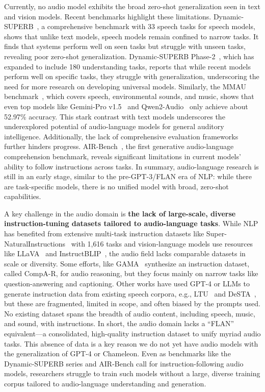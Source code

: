 Currently, no audio model exhibits the broad zero-shot generalization seen in text and vision models. Recent benchmarks highlight these limitations. Dynamic-SUPERB~\citep{huang2024dynamicsuperbdynamiccollaborativecomprehensive}, a comprehensive benchmark with 33 speech tasks for speech models, shows that unlike text models, speech models remain confined to narrow tasks. It finds that systems perform well on seen tasks but struggle with unseen tasks, revealing poor zero-shot generalization. Dynamic-SUPERB Phase-2~\citep{dynamicsuperb2}, which has expanded to include 180 understanding tasks, reports that while recent models perform well on specific tasks, they struggle with generalization, underscoring the need for more research on developing universal models. Similarly, the MMAU benchmark~\citep{mmau}, which covers speech, environmental sounds, and music, shows that even top models like Gemini-Pro v1.5~\citep{team2024gemini} and Qwen2-Audio~\citep{chu2024qwen2} only achieve about 52.97\% accuracy. This stark contrast with text models underscores the underexplored potential of audio-language models for general auditory intelligence. Additionally, the lack of comprehensive evaluation frameworks further hinders progress. AIR-Bench~\citep{AIR_Bench}, the first generative audio-language comprehension benchmark, reveals significant limitations in current models' ability to follow instructions across tasks. In summary, audio-language research is still in an early stage, similar to the pre-GPT-3/FLAN era of NLP: while there are task-specific models, there is no unified model with broad, zero-shot capabilities.

A key challenge in the audio domain is \textbf{the lack of large-scale, diverse instruction-tuning datasets tailored to audio-language tasks}. While NLP has benefited from extensive multi-task instruction datasets like Super-NaturalInstructions~\citep{Super_naturalinstructions} with 1,616 tasks and vision-language models use resources like LLaVA~\citep{LLaVA} and InstructBLIP~\citep{instructblip}, the audio field lacks comparable datasets in scale or diversity. 
Some efforts, like GAMA~\citep{GAMA} synthesize an instruction dataset, called CompA-R, for audio reasoning, but they focus mainly on narrow tasks like question-answering and captioning. Other works have used GPT-4 or LLMs to generate instruction data from existing speech corpora,  e.g., LTU~\citep{gong2023listen} and DeSTA~\citep{gong2023joint}, but these are fragmented, limited in scope, and often biased by the prompts used. 
No existing dataset spans the breadth of audio content, including speech, music, and sound, with instructions. In short, the audio domain lacks a “FLAN” equivalent—a consolidated, high-quality instruction dataset to unify myriad audio tasks. This absence of data is a key reason we do not yet have audio models with the generalization of GPT-4 or Chameleon. Even as benchmarks like the Dynamic-SUPERB series and AIR-Bench call for instruction-following audio models, researchers struggle to train such models without a large, diverse training corpus tailored to audio-language understanding and generation.



